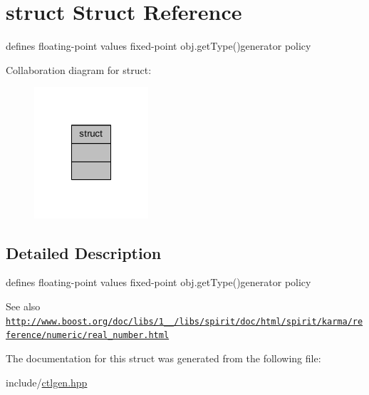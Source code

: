 \hypertarget{structstruct}{\section{struct Struct Reference}
\label{structstruct}
}


defines floating-\/point values fixed-\/point obj.\-get\-Type()generator policy  




Collaboration diagram for struct\-:
\nopagebreak
\begin{figure}[H]
\begin{center}
\leavevmode
\includegraphics[width=120pt]{structstruct__coll__graph}
\end{center}
\end{figure}


\subsection{Detailed Description}
defines floating-\/point values fixed-\/point obj.\-get\-Type()generator policy 

\begin{DoxySeeAlso}{See also}
\href{http://www.boost.org/doc/libs/1_41_0/libs/spirit/doc/html/spirit/karma/reference/numeric/real_number.html}{\tt http\-://www.\-boost.\-org/doc/libs/1\-\_\-\_/libs/spirit/doc/html/spirit/karma/reference/numeric/real\-\_\-number.\-html} 
\end{DoxySeeAlso}


The documentation for this struct was generated from the following file\-:\begin{DoxyCompactItemize}
\item 
include/\hyperlink{ctlgen_8hpp}{ctlgen.\-hpp}\end{DoxyCompactItemize}
